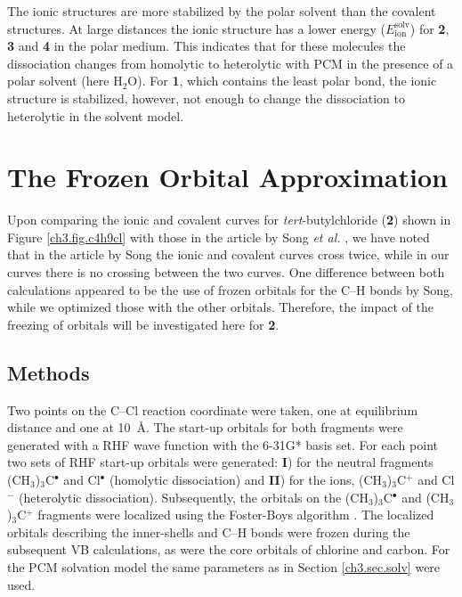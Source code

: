 The ionic structures are more stabilized by the polar solvent than the covalent structures. At large distances the ionic structure has a lower energy ($E_\mathrm{ion}^\mathrm{solv}$) for \textbf{2}, \textbf{3} and \textbf{4} in the polar medium. This indicates that for these molecules the dissociation changes from homolytic to heterolytic with PCM in the presence of a polar solvent (here H$_2$O). For \textbf{1}, which contains the least polar bond, the ionic structure is stabilized, however, not enough to change the dissociation to heterolytic in the solvent model.

\section{The Frozen Orbital Approximation}

Upon comparing the ionic and covalent curves for \textit{tert}-butylchloride (\textbf{2}) shown in Figure \ref{ch3.fig.c4h9cl} with those in the article by Song \textit{et al.} \cite{song}, we have noted that in the article by Song the ionic and covalent curves cross twice, while in our curves there is no crossing between the two curves. One difference between both calculations appeared to be the use of frozen orbitals for the C--H bonds by Song, while we optimized those with the other orbitals. Therefore, the impact of the freezing of orbitals will be investigated here for \textbf{2}.

\subsection{Methods}

Two points on the C--Cl reaction coordinate were taken, one at equilibrium distance and one at \mbox{10 \AA}. The start-up orbitals for both fragments were generated with a RHF wave function with the 6-31G* basis set. For each point two sets of RHF start-up orbitals were generated: \textbf{I}) for the neutral fragments (CH$_3$)$_3$C$^\bullet$ and Cl$^\bullet$ (homolytic dissociation) and \textbf{II}) for the ions, (CH$_3$)$_3$C$^{+}$ and Cl$^{-}$ (heterolytic dissociation). Subsequently, the orbitals on the (CH$_3$)$_3$C$^\bullet$ and (CH$_3$)$_3$C$^{+}$ fragments were localized using the Foster-Boys algorithm \cite{foster}. The localized orbitals describing the inner-shells and C--H bonds were frozen during the subsequent VB calculations, as were the core orbitals of chlorine and carbon.  For the PCM solvation model the same parameters as in Section \ref{ch3.sec.solv} were used.

